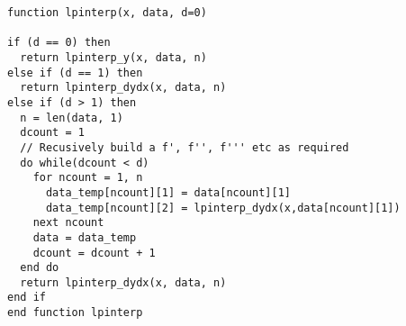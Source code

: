 \begin{lstlisting}[style=sPseudo,caption={}]
function lpinterp(x, data, d=0)

if (d == 0) then
  return lpinterp_y(x, data, n)
else if (d == 1) then
  return lpinterp_dydx(x, data, n)  
else if (d > 1) then
  n = len(data, 1)
  dcount = 1
  // Recusively build a f', f'', f''' etc as required
  do while(dcount < d) 
    for ncount = 1, n
      data_temp[ncount][1] = data[ncount][1]
      data_temp[ncount][2] = lpinterp_dydx(x,data[ncount][1])    
    next ncount
    data = data_temp
    dcount = dcount + 1
  end do
  return lpinterp_dydx(x, data, n)    
end if
end function lpinterp

\end{lstlisting}